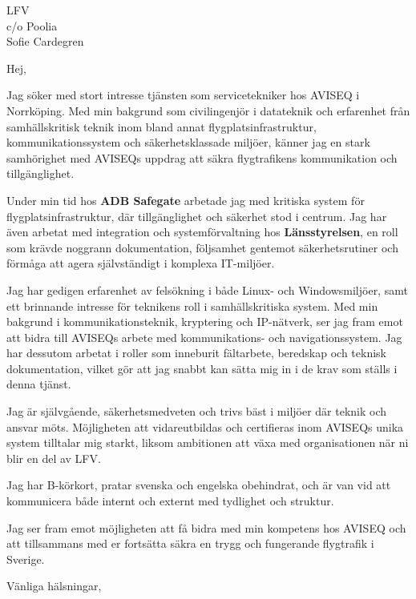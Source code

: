 \documentclass[a4paper,11pt]{letter}
\date{\today}
\begin{document}
\begin{letter}{LFV\\c/o Poolia\\Sofie Cardegren}

\opening{Hej,}

Jag söker med stort intresse tjänsten som servicetekniker hos AVISEQ i Norrköping. Med min bakgrund som civilingenjör i datateknik och erfarenhet från samhällskritisk teknik inom bland annat flygplatsinfrastruktur, kommunikationssystem och säkerhetsklassade miljöer, känner jag en stark samhörighet med AVISEQs uppdrag att säkra flygtrafikens kommunikation och tillgänglighet.

Under min tid hos \textbf{ADB Safegate} arbetade jag med kritiska system för flygplatsinfrastruktur, där tillgänglighet och säkerhet stod i centrum. Jag har även arbetat med integration och systemförvaltning hos \textbf{Länsstyrelsen}, en roll som krävde noggrann dokumentation, följsamhet gentemot säkerhetsrutiner och förmåga att agera självständigt i komplexa IT-miljöer.

Jag har gedigen erfarenhet av felsökning i både Linux- och Windowsmiljöer, samt ett brinnande intresse för teknikens roll i samhällskritiska system. Med min bakgrund i kommunikationsteknik, kryptering och IP-nätverk, ser jag fram emot att bidra till AVISEQs arbete med kommunikations- och navigationssystem. Jag har dessutom arbetat i roller som inneburit fältarbete, beredskap och teknisk dokumentation, vilket gör att jag snabbt kan sätta mig in i de krav som ställs i denna tjänst.

Jag är självgående, säkerhetsmedveten och trivs bäst i miljöer där teknik och ansvar möts. Möjligheten att vidareutbildas och certifieras inom AVISEQs unika system tilltalar mig starkt, liksom ambitionen att växa med organisationen när ni blir en del av LFV.

Jag har B-körkort, pratar svenska och engelska obehindrat, och är van vid att kommunicera både internt och externt med tydlighet och struktur.

Jag ser fram emot möjligheten att få bidra med min kompetens hos AVISEQ och att tillsammans med er fortsätta säkra en trygg och fungerande flygtrafik i Sverige.

\closing{Vänliga hälsningar,}

\end{letter}
\end{document}
